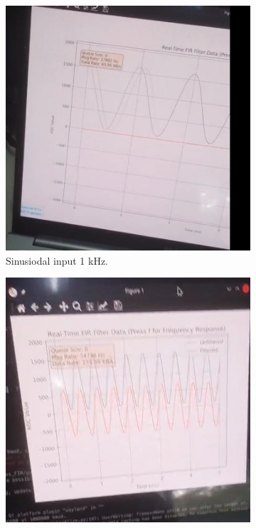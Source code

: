 \documentclass[a4paper,12pt]{article}
\begin{document}
\begin{figure}[H]
    \centering
    \begin{subfigure}[b]{0.3\textwidth}
        \includegraphics[width=\textwidth]{images/real_stopband_1k.png}
        \caption{Sinusiodal input 1 kHz.}
    \end{subfigure}
    \hfill
    \begin{subfigure}[b]{0.3\textwidth}
        \includegraphics[width=\textwidth]{images/real_passband_2k.png}

\end{subfigure}
\end{figure}
\end{document}
